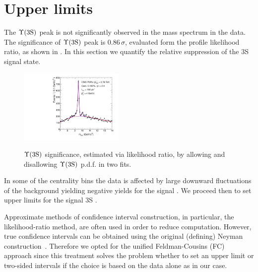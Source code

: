 \chapter{Upper limits}

The $\Upsilon\mathrm{(3S)}$ peak is not significantly observed in the  mass spectrum in the \PbPb data.
The significance of $\Upsilon\mathrm{(3S)}$ peak is 0.86$\,\sigma$, evaluated form the profile likelihood ratio, as shown in . In this section we quantify the relative suppression of the 3S signal state.

\begin{figure}[hbtp]
  \begin{center}
{\includegraphics[angle=0,width=0.45\textwidth]{figures/limits/Y3S_significance.pdf}}
   \caption{$\Upsilon\mathrm{(3S)}$ significance, estimated via likelihood ratio, by allowing and disallowing $\Upsilon\mathrm{(3S)}$ p.d.f. in two fits.
}
    \label{fig:3S-significance}
  \end{center}
\end{figure}


In some of the centrality bins the data is affected by large downward fluctuations of the background yielding negative yields for the signal \PgUc. We proceed then to set upper limits for the signal 3S .

Approximate methods of confidence interval construction, in particular, the likelihood-ratio method, are often used in order to reduce computation. However, true confidence intervals can be obtained using the original (defining) Neyman construction~\cite{Neyman}.  
Therefore we opted for the unified Feldman-Cousins (FC) approach since this treatment solves the problem whether to set an upper limit or two-sided intervals if the choice is based on the data alone as in our case. 

